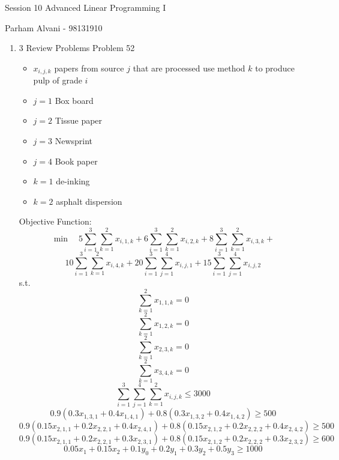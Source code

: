 \documentclass{article}
\begin{document}
\large %


{\Large Session 10 %
\hfill  Advanced Linear Programming I}

\begin{center}
{\Large Parham Alvani - 98131910} %
\end{center}
\vspace{0.05in}


\begin{enumerate}

\item 3 Review Problems Problem 52
\begin{itemize}
\item \(x_{i,j,k}\) papers from source \(j\) that are processed use method \(k\) to produce pulp of grade \(i\)
\item \(j = 1\) Box board
\item \(j = 2\) Tissue paper
\item \(j = 3\) Newsprint
\item \(j = 4\) Book paper
\item \(k = 1\) de-inking
\item \(k = 2\) asphalt dispersion
\end{itemize}
\par
Objective Function:
\[
    \min\quad
        5 \sum_{i=1}^3\sum_{k=1}^2x_{i,1,k} +
        6 \sum_{i=1}^3\sum_{k=1}^2x_{i,2,k} +
        8 \sum_{i=1}^3\sum_{k=1}^2x_{i,3,k} +
\]
\[
        10 \sum_{i=1}^3\sum_{k=1}^2x_{i,4,k} +
        20 \sum_{i=1}^3\sum_{j=1}^4x_{i,j,1} +
        15 \sum_{i=1}^3\sum_{j=1}^4x_{i,j,2}
\]
s.t.
\[
    \sum_{k=1}^2x_{1,1,k} = 0
\]
\[
    \sum_{k=1}^2x_{1,2,k} = 0
\]
\[
    \sum_{k=1}^2x_{2,3,k} = 0
\]
\[
    \sum_{k=1}^2x_{3,4,k} = 0
\]
\[
    \sum_{i=1}^3\sum_{j=1}^4\sum_{k=1}^2x_{i,j,k} \le 3000
\]
\[
    0.9 (0.3 x_{1,3,1} + 0.4 x_{1,4,1}) + 0.8 (0.3 x_{1,3,2} + 0.4 x_{1,4,2}) \ge 500
\]
\[
    0.9 (0.15 x_{2,1,1} + 0.2 x_{2,2,1} + 0.4 x_{2,4,1}) + 0.8 (0.15 x_{2,1,2} + 0.2 x_{2,2,2} + 0.4 x_{2,4,2}) \ge 500
\]
\[
    0.9 (0.15 x_{2,1,1} + 0.2 x_{2,2,1} + 0.3 x_{2,3,1}) + 0.8 (0.15 x_{2,1,2} + 0.2 x_{2,2,2} + 0.3 x_{2,3,2}) \ge 600
\]
\[
    0.05 x_1 + 0.15 x_2 + 0.1 y_0 + 0.2 y_1 + 0.3 y_2 + 0.5 y_3 \ge 1000
\]

\end{enumerate}

\end{document}

